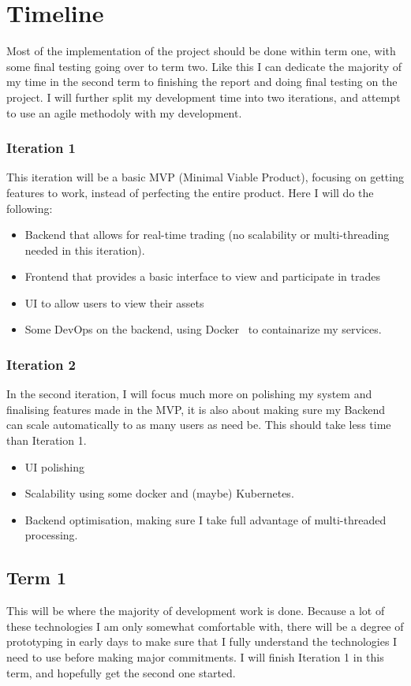 \documentclass[titlepage]{article}
\begin{document}
\pagebreak

\section{Timeline}
Most of the implementation of the project should be done within term one, with some final testing going over to term two. Like this I can dedicate the majority of my time in the second term to finishing the report and doing final testing on the project. I will further split my development time into two iterations, and attempt to use an agile methodoly with my development.  

\subsubsection{Iteration 1}
This iteration will be a basic MVP (Minimal Viable Product), focusing on getting features to work, instead of perfecting the entire product. Here I will do the following:
\begin{itemize}
	\item Backend that allows for real-time trading (no scalability or multi-threading needed in this iteration).
	\item Frontend that provides a basic interface to view and participate in trades
	\item UI to allow users to view their assets
  \item Some DevOps on the backend, using Docker~\cite{docker} to containarize my services.
\end{itemize}

\subsubsection{Iteration 2}
In the second iteration, I will focus much more on polishing my system and finalising features made in the MVP, it is also about making sure my Backend can scale automatically to as many users as need be. This should take less time than Iteration 1.
\begin{itemize}
	\item UI polishing
	\item Scalability using some docker and (maybe) Kubernetes.
	\item Backend optimisation, making sure I take full advantage of multi-threaded processing.
\end{itemize}

\subsection{Term 1}
This will be where the majority of development work is done. Because a lot of these technologies I am only somewhat comfortable with, there will be a degree of prototyping in early days to make sure that I fully understand the technologies I need to use before making major commitments. I will finish Iteration 1 in this term, and hopefully get the second one started.
\end{document}
